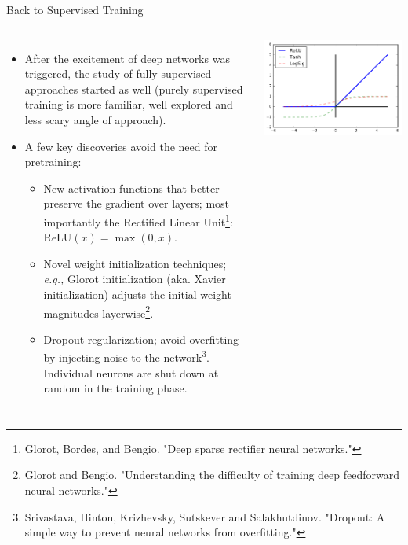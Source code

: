 \documentclass[10pt, aspectratio=169]{beamer} %
\begin{document}
\begin{frame}[fragile,allowframebreaks=0.8]{Back to Supervised Training}
\begin{columns}[onlytextwidth]
	\begin{itemize}
		\item After the excitement of deep networks was triggered, the study of fully
		supervised approaches started as well (purely supervised training is more familiar,
		well explored and less scary angle of approach).
		\item A few key discoveries avoid the need for pretraining:
		\begin{itemize}
			\item New activation functions that better preserve the gradient over layers; most importantly the
			Rectified Linear Unit\footnote{\tiny Glorot, Bordes, and Bengio. "Deep sparse rectifier neural networks."}: $\text{ReLU}(x) = \max(0, x)$.
			\item Novel weight initialization techniques; \emph{e.g.,} Glorot initialization (aka. Xavier initialization) adjusts the initial weight magnitudes layerwise\footnote{\tiny Glorot and Bengio. "Understanding the difficulty of training deep feedforward neural networks."}.
			\item Dropout regularization; avoid overfitting by injecting noise to the network\footnote{\tiny Srivastava, Hinton, Krizhevsky, Sutskever and Salakhutdinov. "Dropout: A simple way to prevent neural networks from overfitting."}. Individual neurons are shut down at random in the training phase.
		\end{itemize}
		\end{itemize}
\hspace*{-2cm}\includegraphics[width=\columnwidth]{images/ReLU.pdf}
\end{columns}
\end{frame}
\end{document}
